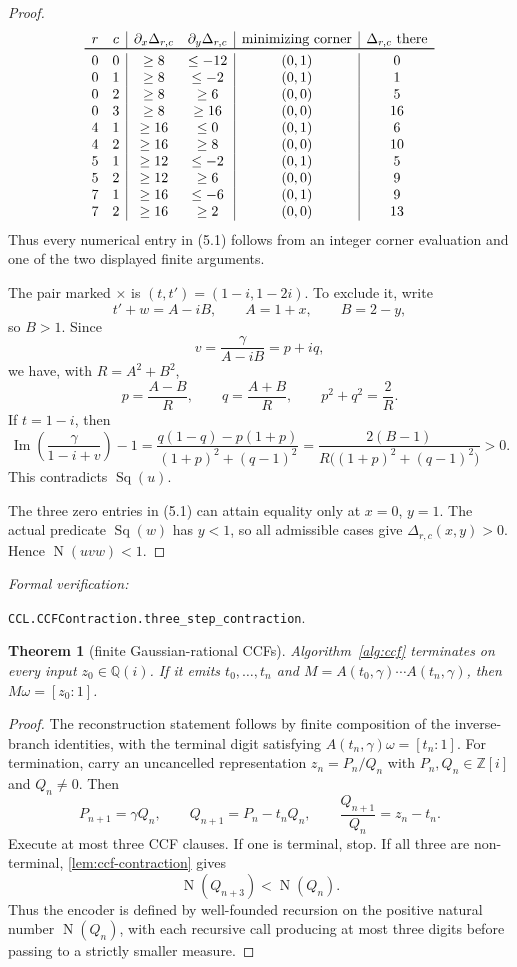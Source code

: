 \documentclass[10pt]{article}
\newtheorem{theorem}{Theorem}[section]
\theoremstyle{definition}
\theoremstyle{remark}
\newcommand{\Qi}{\mathbb{Q}(i)}
\newcommand{\Zi}{\mathbb{Z}[i]}
\newcommand{\Norm}{\operatorname{N}}
\newcommand{\Imm}{\operatorname{Im}}
\newcommand{\leanref}[1]{\par\smallskip\noindent
  \emph{Formal verification:}\par\nobreak
  {\raggedright\nolinkurl{#1}.\par}}
\newcommand{\Proj}[2]{[#1:#2]}
\begin{document}
\begin{proof}
\[
\begin{array}{cc|cc|c|c}
r&c&\partial_x\Delta_{r,c}&\partial_y\Delta_{r,c}
   &\text{minimizing corner}&\Delta_{r,c}\text{ there}\\ \toprule
0&0&\ge 8&\le-12&(0,1)&0\\
0&1&\ge 8&\le-2 &(0,1)&1\\
0&2&\ge 8&\ge 6 &(0,0)&5\\
0&3&\ge 8&\ge16 &(0,0)&16\\
4&1&\ge16&\le 0 &(0,1)&6\\
4&2&\ge16&\ge 8 &(0,0)&10\\
5&1&\ge12&\le-2 &(0,1)&5\\
5&2&\ge12&\ge 6 &(0,0)&9\\
7&1&\ge16&\le-6 &(0,1)&9\\
7&2&\ge16&\ge 2 &(0,0)&13
\end{array}
\]
Thus every numerical entry in (5.1) follows from an integer corner evaluation and one of the two displayed finite arguments.

The pair marked $\times$ is $(t,t')=(1-i,1-2i)$.  To exclude it, write
\[
 t'+w=A-iB,
 \qquad A=1+x,
 \qquad B=2-y,
\]
so $B>1$.  Since
\[
 v=\frac\gamma{A-iB}=p+iq,
\]
we have, with $R=A^2+B^2$,
\[
 p=\frac{A-B}{R},\qquad q=\frac{A+B}{R},\qquad p^2+q^2=\frac2R.
\]
If $t=1-i$, then
\[
 \Imm\!\left(\frac\gamma{1-i+v}\right)-1
 =\frac{q(1-q)-p(1+p)}{(1+p)^2+(q-1)^2}
 =\frac{2(B-1)}{R\bigl((1+p)^2+(q-1)^2\bigr)}>0.
\]
This contradicts $\operatorname{Sq}(u)$.

The three zero entries in (5.1) can attain equality only at $x=0$, $y=1$.  The actual predicate $\operatorname{Sq}(w)$ has $y<1$, so all admissible cases give $\Delta_{r,c}(x,y)>0$.  Hence $\Norm(uvw)<1$.
\end{proof}

\leanref{CCL.CCFContraction.three_step_contraction}

\begin{theorem}[finite Gaussian-rational CCFs]\label{thm:ccf-finite}
Algorithm~\ref{alg:ccf} terminates on every input $z_0\in\Qi$.  If it emits $t_0,\ldots,t_n$ and $M=A(t_0,\gamma)\cdots A(t_n,\gamma)$, then $M\omega=\Proj{z_0}{1}$.
\end{theorem}

\begin{proof}
The reconstruction statement follows by finite composition of the inverse-branch identities, with the terminal digit satisfying $A(t_n,\gamma)\omega=\Proj{t_n}{1}$.  For termination, carry an uncancelled representation $z_n=P_n/Q_n$ with $P_n,Q_n\in\Zi$ and $Q_n\ne0$.  Then
\[
 P_{n+1}=\gamma Q_n,
 \qquad
 Q_{n+1}=P_n-t_nQ_n,
 \qquad
 \frac{Q_{n+1}}{Q_n}=z_n-t_n.
\]
Execute at most three CCF clauses.  If one is terminal, stop.  If all three are non-terminal, \autoref{lem:ccf-contraction} gives
\[
 \Norm(Q_{n+3})<\Norm(Q_n).
\]
Thus the encoder is defined by well-founded recursion on the positive natural number $\Norm(Q_n)$, with each recursive call producing at most three digits before passing to a strictly smaller measure.
\end{proof}
\end{document}
